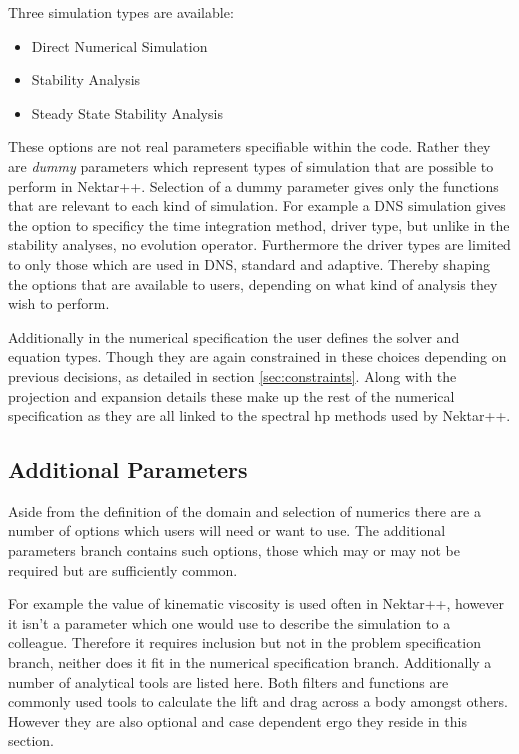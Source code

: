 \documentclass[11pt, a4paper]{report}
\begin{document}
Three simulation types are available:
\begin{itemize}
\item Direct Numerical Simulation
\item Stability Analysis
\item Steady State Stability Analysis
\end{itemize}

These options are not real parameters specifiable within the code. Rather they are \textit{dummy} parameters which represent types of simulation that are possible to perform in Nektar++. Selection of a dummy parameter gives only the functions that are relevant to each kind of simulation. For example a DNS simulation gives the option to specificy the time integration method, driver type, but unlike in the stability analyses, no evolution operator. Furthermore the driver types are limited to only those which are used in DNS, standard and adaptive. Thereby shaping the options that are available to users, depending on what kind of analysis they wish to perform.

Additionally in the numerical specification the user defines the solver and equation types. Though they are again constrained in these choices depending on previous decisions, as detailed in section \ref{sec:constraints}. Along with the projection and expansion details these make up the rest of the numerical specification as they are all linked to the spectral hp methods used by Nektar++.

\subsection{Additional Parameters}
Aside from the definition of the domain and selection of numerics there are a number of options which users will need or want to use. The additional parameters branch contains such options, those which may or may not be required but are sufficiently common.

For example the value of kinematic viscosity is used often in Nektar++, however it isn't a parameter which one would use to describe the simulation to a colleague. Therefore it requires inclusion but not in the problem specification branch, neither does it fit in the numerical specification branch. Additionally a number of analytical tools are listed here. Both filters and functions are commonly used tools to calculate the lift and drag across a body amongst others. However they are also optional and case dependent ergo they reside in this section.
\end{document}
